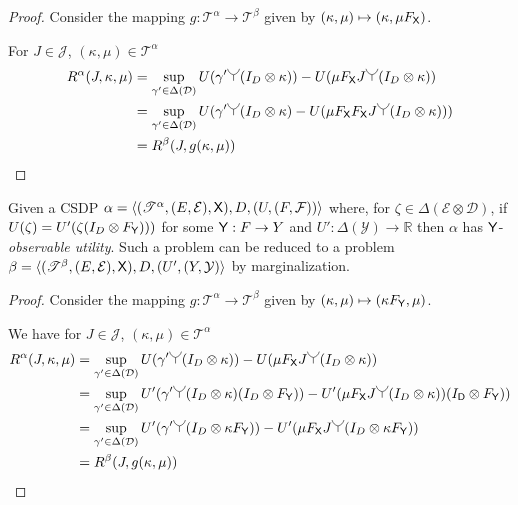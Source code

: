 \begin{proof}
Consider the mapping $g:\mathscr{T}^\alpha\to\mathscr{T}^\beta$ given by $(\kappa,\mu)\mapsto (\kappa ,\mu F_{\mathsf{X}})$.

For $J\in \mathscr{J}$, $(\kappa,\mu)\in\mathscr{T}^\alpha$
\begin{align}
    R^\alpha(J,\kappa,\mu) &= \sup_{\gamma'\in\Delta(\mathcal{D})} U(\gamma'\splitter{0.15}(I_D\otimes\kappa)) - U(\mu F_{\RV{X}} J\splitter{0.15}(I_D\otimes\kappa))\\
                           &= \sup_{\gamma'\in\Delta(\mathcal{D})} U(\gamma'\splitter{0.15}(I_D\otimes\kappa) - U(\mu F_{\RV{X}} F_{\RV{X}} J\splitter{0.15} (I_D\otimes\kappa)))\\
                           &= R^\beta (J,g(\kappa,\mu))
\end{align}
\end{proof}

\begin{theorem}\label{th:CSDP_u_red}
Given a CSDP $\alpha=\langle (\mathscr{T}^\alpha,(E,\mathcal{E}),\mathsf{X}),D,(U,(F,\mathcal{F}))\rangle$ where, for $\zeta\in \Delta(\mathcal{E}\otimes\mathcal{D})$, if $U(\zeta)=U'(\zeta(I_D\otimes F_{\mathsf{Y}}) ))$ for some $\mathsf{Y}: F\to Y$ and $U':\Delta(\mathcal{Y})\to \mathbb{R}$ then $\alpha$ has $\mathsf{Y}$-\emph{observable utility}. Such a problem can be reduced to a problem $\beta=\langle (\mathscr{T}^\beta,(E,\mathcal{E}),\mathsf{X}),D,(U',(Y,\mathcal{Y})\rangle$ by marginalization. 
\end{theorem}

\begin{proof}
Consider the mapping $g:\mathscr{T}^\alpha\to\mathscr{T}^\beta$ given by $(\kappa,\mu)\mapsto (\kappa F_{\mathsf{Y}},\mu)$.

We have for $J\in \mathscr{J}$, $(\kappa,\mu)\in\mathscr{T}^\alpha$
\begin{align}
    R^\alpha(J,\kappa,\mu) &= \sup_{\gamma'\in\Delta(\mathcal{D})} U(\gamma'\splitter{0.15}(I_D\otimes\kappa)) - U(\mu F_{\RV{X}} J\splitter{0.15}(I_D\otimes\kappa))\\
                           &= \sup_{\gamma'\in\Delta(\mathcal{D})} U'(\gamma'\splitter{0.15}(I_D\otimes\kappa)(I_D \otimes  F_{\RV{Y}})) - U'(\mu F_{\RV{X}} J\splitter{0.15} (I_D\otimes\kappa))(I_{\RV{D}}\otimes F_{\RV{Y}}))\\
                           &= \sup_{\gamma'\in\Delta(\mathcal{D})} U'(\gamma'\splitter{0.15}(I_D\otimes \kappa F_{\RV{Y}})) - U'(\mu F_{\RV{X}} J\splitter{0.15}(I_D\otimes \kappa F_{\RV{Y}}))\\
                           &= R^\beta (J,g(\kappa,\mu))
\end{align}
\end{proof}

